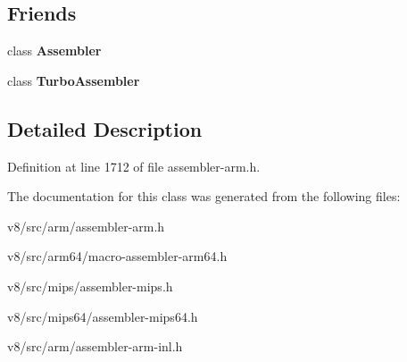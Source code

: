 \subsection*{Friends}
\begin{DoxyCompactItemize}
\item 
\mbox{\label{classv8_1_1internal_1_1UseScratchRegisterScope_a08829e094e460cdd0df495c883c39ce2}} 
class {\bfseries Assembler}
\item 
\mbox{\label{classv8_1_1internal_1_1UseScratchRegisterScope_a90a25e31d5cc70a4d5de4b83de528212}} 
class {\bfseries Turbo\+Assembler}
\end{DoxyCompactItemize}


\subsection{Detailed Description}


Definition at line 1712 of file assembler-\/arm.\+h.



The documentation for this class was generated from the following files\+:\begin{DoxyCompactItemize}
\item 
v8/src/arm/assembler-\/arm.\+h\item 
v8/src/arm64/macro-\/assembler-\/arm64.\+h\item 
v8/src/mips/assembler-\/mips.\+h\item 
v8/src/mips64/assembler-\/mips64.\+h\item 
v8/src/arm/assembler-\/arm-\/inl.\+h\end{DoxyCompactItemize}
